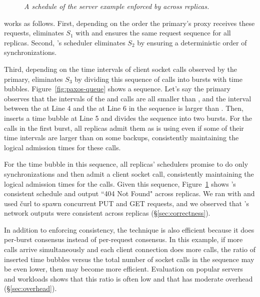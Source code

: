 \begin{figure}[t]
\centering
{}
\vspace{-.2in}
\caption{{\em A schedule of the server example enforced by 
\xxx across replicas.}}\label{fig:dmt-schedule}
\vspace{-.05in}
\end{figure}


\xxx works as follows. First, depending on the order the primary's proxy 
receives these requests, \xxx eliminates $S_1$ with \paxos and ensures the 
same request sequence for all replicas. Second, \xxx's \dmt 
scheduler eliminates $S_2$ by ensuring a deterministic order of \pthread 
synchronizations.

Third, depending on the time intervals of client socket calls 
observed by the primary, \xxx eliminates $S_3$ by dividing this sequence of 
calls into bursts with time bubbles. Figure~\ref{fig:paxos-queue} shows a 
sequence. Let's say the primary observes that the 
intervals of the \connect and \send calls are all smaller than \ntimeout, and 
the interval between the \send at Line 4 and the \close at Line 6 in the 
sequence is larger than \ntimeout. Then, \xxx inserts a time bubble at Line 5 
and divides the sequence into two bursts. For the calls in the first burst, all 
replicas admit them as is using \dmt even if some of their time intervals are 
larger than \ntimeout on some backups, consistently maintaining the logical 
admission times for these calls.

For the time bubble in this sequence, all replicas' \dmt schedulers promise to 
do only \nclock \pthread synchronizations and then admit a client 
socket call, consistently maintaining the logical admission times 
for the \close calls. Given this sequence, Figure~\ref{fig:dmt-schedule} shows 
\xxx's consistent schedule and output ``404 Not Found" across replicas. 
We ran \xxx with \apache and used \v{curl} to spawn concurrent PUT 
and GET requests, and we observed that \apache's network outputs were 
consistent across replicas (\S\ref{sec:correctness}).

In addition to enforcing consistency, the \timealgo technique is 
also efficient because it does per-burst consensus instead of per-request 
consensus. In this example, if more \connect calls arrive simultaneously and 
each client connection does more \send calls, the ratio of inserted 
time bubbles versus the total number of socket calls in the sequence may be 
even lower, then \xxx may become more efficient. Evaluation on popular servers 
and workloads shows that this ratio is often low and that \xxx has moderate 
overhead  (\S\ref{sec:overhead}).

